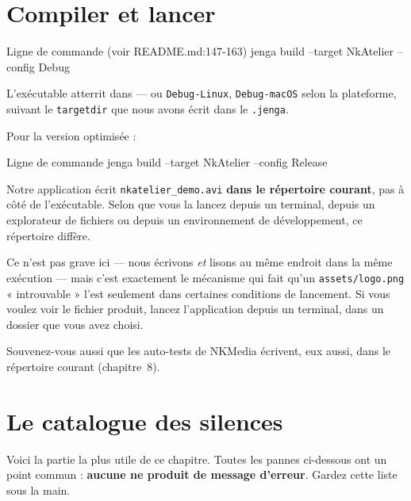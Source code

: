 \section{Compiler et lancer}

\begin{nkcode}{Ligne de commande (voir README.md:147-163)}
jenga build --target NkAtelier --config Debug
\end{nkcode}

L'exécutable atterrit dans
 — ou
\texttt{Debug-Linux}, \texttt{Debug-macOS} selon la plateforme, suivant le
\texttt{targetdir} que nous avons écrit dans le \texttt{.jenga}.

Pour la version optimisée :

\begin{nkcode}{Ligne de commande}
jenga build --target NkAtelier --config Release
\end{nkcode}

\begin{nkpiege}
Notre application écrit \texttt{nkatelier\_demo.avi} \textbf{dans le répertoire
courant}, pas à côté de l'exécutable. Selon que vous la lancez depuis un
terminal, depuis un explorateur de fichiers ou depuis un environnement de
développement, ce répertoire diffère.

Ce n'est pas grave ici — nous écrivons \emph{et} lisons au même endroit dans la
même exécution — mais c'est exactement le mécanisme qui fait qu'un
\texttt{assets/logo.png} « introuvable » l'est seulement dans certaines
conditions de lancement. Si vous voulez voir le fichier produit, lancez
l'application depuis un terminal, dans un dossier que vous avez choisi.

Souvenez-vous aussi que les auto-tests de NKMedia écrivent, eux aussi, dans le
répertoire courant (chapitre~8).
\end{nkpiege}

\section{Le catalogue des silences}

Voici la partie la plus utile de ce chapitre. Toutes les pannes ci-dessous ont
un point commun : \textbf{aucune ne produit de message d'erreur}. Gardez cette
liste sous la main.


